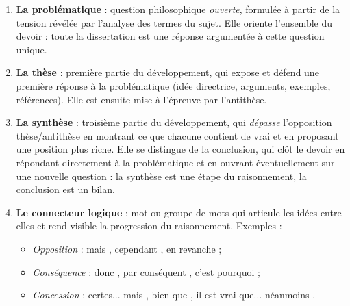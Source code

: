 \documentclass[11pt]{article}
\newcommand{\cle}[1]{{\popxbold\color{popdark}#1}}
\begin{document}
\begin{corrige}
\begin{enumerate}
\item \textbf{La problématique} : question philosophique \emph{ouverte}, formulée à partir de la tension révélée par l'analyse des termes du sujet. Elle oriente l'ensemble du devoir : toute la dissertation est une réponse argumentée à cette question unique.

\item \textbf{La thèse} : première partie du développement, qui expose et défend une première réponse à la problématique (idée directrice, arguments, exemples, références). Elle est ensuite mise à l'épreuve par l'antithèse.

\item \textbf{La synthèse} : troisième partie du développement, qui \emph{dépasse} l'opposition thèse/antithèse en montrant ce que chacune contient de vrai et en proposant une position plus riche. Elle se distingue de la \cle{conclusion}, qui clôt le devoir en répondant directement à la problématique et en ouvrant éventuellement sur une nouvelle question : la synthèse est une étape du raisonnement, la conclusion est un bilan.

\item \textbf{Le connecteur logique} : mot ou groupe de mots qui articule les idées entre elles et rend visible la progression du raisonnement. Exemples :
\begin{itemize}
\item \emph{Opposition} : \og mais \fg{}, \og cependant \fg{}, \og en revanche \fg{} ;
\item \emph{Conséquence} : \og donc \fg{}, \og par conséquent \fg{}, \og c'est pourquoi \fg{} ;
\item \emph{Concession} : \og certes... mais \fg{}, \og bien que \fg{}, \og il est vrai que... néanmoins \fg{}.
\end{itemize}
\end{enumerate}
\end{corrige}
\end{document}
